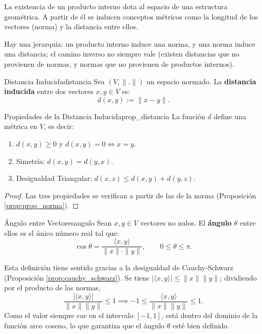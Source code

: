 \documentclass[11pt, a4paper]{article}
\begin{document}
La existencia de un producto interno dota al espacio de una estructura geométrica. A partir de él se inducen conceptos métricos como la longitud de los vectores (norma) y la distancia entre ellos.

Hay una jerarquía: un producto interno induce una norma, y una norma induce una distancia; el camino inverso no siempre vale (existen distancias que no provienen de normas, y normas que no provienen de productos internos).

\begin{definicion}{Distancia Inducida}{distancia}
Sea $(V,\|.\|)$ un espacio normado. La \textbf{distancia inducida} entre dos vectores $x, y \in V$ es:
\[
d(x,y) := \|x-y\|.
\]
\end{definicion}

\begin{proposicion}{Propiedades de la Distancia Inducida}{prop_distancia}
La función $d$ define una métrica en $V$, es decir:
\begin{enumerate}
    \item $d(x,y) \ge 0$ y $d(x,y)=0 \iff x=y$.
    \item Simetría: $d(x,y) = d(y,x)$.
    \item Desigualdad Triangular: $d(x,z) \le d(x,y) + d(y,z)$.
\end{enumerate}
\end{proposicion}

\begin{proof}
Las tres propiedades se verifican a partir de las de la norma (Proposición \ref{prop:prop_norma}).
\end{proof}

\begin{definicion}{Ángulo entre Vectores}{angulo}
Sean $x, y \in V$ vectores no nulos. El \textbf{ángulo} $\theta$ entre ellos es el único número real tal que:
\[
\cos\theta = \frac{\langle x,y\rangle}{\|x\|\cdot\|y\|}, \qquad 0 \le \theta \le \pi.
\]
\end{definicion}

\obs Esta definición tiene sentido gracias a la desigualdad de Cauchy-Schwarz (Proposición \ref{prop:cauchy_schwarz}).
Se tiene $|\langle x, y \rangle| \le \|x\| \|y\|$; dividiendo por el producto de las normas,
\[
\frac{|\langle x, y \rangle|}{\|x\| \|y\|} \le 1 \implies -1 \le \frac{\langle x, y \rangle}{\|x\| \|y\|} \le 1.
\]
Como el valor siempre cae en el intervalo $[-1, 1]$, está dentro del dominio de la función arco coseno, lo que garantiza que el ángulo $\theta$ esté bien definido.
\end{document}

